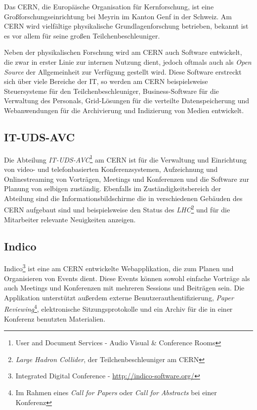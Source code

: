 Das CERN, die Europäische Organisation für Kernforschung, ist eine Großforschungseinrichtung bei
Meyrin im Kanton Genf in der Schweiz. Am CERN wird vielfältige physikalische Grundlagenforschung
betrieben, bekannt ist es vor allem für seine großen Teilchenbeschleuniger. \citep{wiki:cern}

Neben der physikalischen Forschung wird am CERN auch Software entwickelt, die zwar in erster Linie
zur internen Nutzung dient, jedoch oftmals auch als \emph{Open Source} der Allgemeinheit zur Verfügung
gestellt wird. Diese Software erstreckt sich über viele Bereiche der IT, so werden am CERN
beispielsweise Steuersysteme für den Teilchenbeschleuniger, Business-Software für die Verwaltung des
Personals, Grid-Lösungen für die verteilte Datenspeicherung und Webanwendungen für die Archivierung
und Indizierung von Medien entwickelt.

\subsection{IT-UDS-AVC}

Die Abteilung \emph{IT-UDS-AVC}\footnote{User and Document Services - Audio Visual \& Conference
Rooms} am CERN ist für die Verwaltung und Einrichtung von video- und telefonbasierten
Konferenzsystemen, Aufzeichnung und Onlinestreaming von Vorträgen, Meetings und Konferenzen und die
Software zur Planung von selbigen zuständig. Ebenfalls im Zuständigkeitsbereich der Abteilung sind
die Informationsbildschirme die in verschiedenen Gebäuden des CERN aufgebaut sind und beispielsweise
den Status des \emph{LHC}\footnote{\emph{Large Hadron Collider}, der Teilchenbeschleuniger am CERN} und
für die Mitarbeiter relevante Neuigkeiten anzeigen.


\subsection{Indico}

Indico\footnote{Integrated Digital Conference - \href{http://indico-software.org/}{http://indico-software.org/}}
ist eine am CERN entwickelte Webapplikation, die zum Planen und Organisieren von Events dient. Diese
Events können sowohl einfache Vorträge als auch Meetings und Konferenzen mit mehreren Sessions und
Beiträgen sein. Die Applikation unterstützt außerdem externe Benutzerauthentifizierung, \emph{Paper
Reviewing}\footnote{Im Rahmen eines \emph{Call for Papers} oder \emph{Call for Abstracts} bei einer
Konferenz}, elektronische Sitzungsprotokolle und ein Archiv für die in einer Konferenz benutzten
Materialien. \citep{indico}

